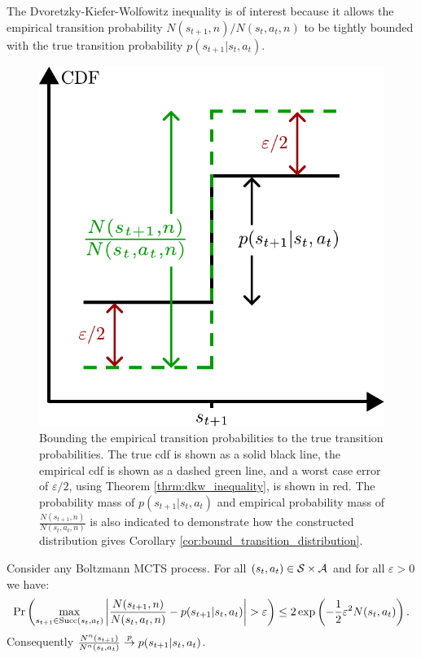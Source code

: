         The Dvoretzky-Kiefer-Wolfowitz inequality is of interest because it allows the empirical transition probability $N(s_{t+1},n)/N(s_t,a_t,n)$ to be tightly bounded with the true transition probability $p(s_{t+1}|s_t,a_t)$. 
        \begin{figure}
            \centering
            \includegraphics[scale=0.6]{figures/ch4/dkw_diagram.pdf}
            \caption[Bounding the empirical transition probabilities to the true transition probabilities.]{Bounding the empirical transition probabilities to the true transition probabilities. The true cdf is shown as a solid black line, the empirical cdf is shown as a dashed green line, and a worst case error of $\varepsilon/2$, using Theorem \ref{thrm:dkw_inequality}, is shown in red. The probability mass of $p(s_{t+1}|s_t,a_t)$ and empirical probability mass of $\frac{N(s_{t+1},n)}{N(s_t,a_t,n)}$ is also indicated to demonstrate how the constructed distribution gives Corollary \ref{cor:bound_transition_distribution}.}
            \label{fig:dkw_diag}
        \end{figure}
        \begin{corollary} \label{cor:bound_transition_distribution}
            Consider any Boltzmann MCTS process. For all $(s_t,a_t)\in\mathcal{S}\times\mathcal{A}$ and for all $\varepsilon >0$ we have:
            \begin{align}
                \Pr\left(\max_{s_{t+1}\in{\textnormal{Succ}(s_t,a_t)}}\left| \frac{N(s_{t+1},n)}{N(s_t,a_t,n)} - p(s_{t+1}|s_t,a_t) \right| > \varepsilon \right) \leq 2 \exp\left(-\frac{1}{2}\varepsilon^2 N(s_t,a_t) \right).
            \end{align}
            Consequently $\frac{N^n(s_{t+1})}{N^n(s_t,a_t)} \overset{p}{\to} p(s_{t+1}|s_t,a_t)$.
        \end{corollary}
